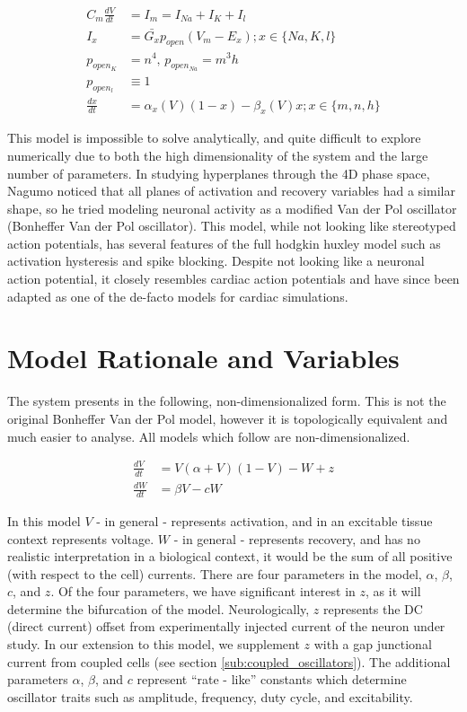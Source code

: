 \documentclass[11pt]{report}
\begin{document}
$$ \begin{aligned} C_m \frac{dV}{dt} &= I_m = I_{Na} + I_{K} + I_l \\ I_x &= \bar{G_x}p_{open}(V_m-E_x); x\in\{Na,K,l\}\\ p_{open_{K}} &= n^4, \, p_{open_{Na}} = m^3h\\ p_{open_{l}} &\equiv 1\\ \frac{dx}{dt} &= \alpha_x(V)(1-x)-\beta_x(V)x; x\in \{m,n,h\} \end{aligned} $$

This model is impossible to solve analytically, and quite difficult to explore numerically due to both the high dimensionality of the system and the large number of parameters. In studying hyperplanes through the 4D phase space, Nagumo noticed that all planes of activation and recovery variables had a similar shape, so he tried modeling neuronal activity as a modified Van der Pol oscillator (Bonheffer Van der Pol oscillator). This model, while not looking like stereotyped action potentials, has several features of the full hodgkin huxley model such as activation hysteresis and spike blocking. Despite not looking like a neuronal action potential, it closely resembles cardiac action potentials and have since been adapted as one of the de-facto models for cardiac simulations. 


\section{Model Rationale and Variables}

The system presents in the following, non-dimensionalized form. This is not the original Bonheffer Van der Pol model, however it is topologically equivalent and much easier to analyse. All models which follow are non-dimensionalized. 

$$ \begin{aligned} \frac{dV}{dt} &= V(\alpha+V)(1-V) -W + z \\
\frac{dW}{dt} &= \beta V-cW \end{aligned} $$

In this model $V$ - in general - represents activation, and in an excitable tissue context represents voltage. $W$ - in general - represents recovery, and has no realistic interpretation in a biological context, it would be the sum of all positive (with respect to the cell) currents. There are four parameters in the model, $\alpha$, $\beta$, $c$, and $z$. Of the four parameters, we have significant interest in $z$, as it will determine the bifurcation of the model. Neurologically, $z$ represents the DC (direct current) offset from experimentally injected current of the neuron under study. In our extension to this model, we supplement $z$ with a gap junctional current from coupled cells (see section \ref{sub:coupled_oscillators}). The additional parameters $\alpha$, $\beta$, and $c$ represent ``rate - like'' constants which determine oscillator traits such as amplitude, frequency, duty cycle, and excitability.
\end{document}
